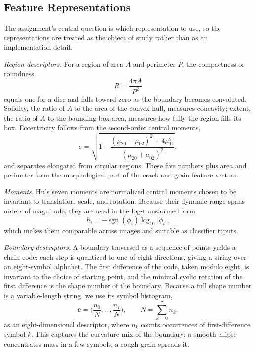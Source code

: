 \documentclass{ieeeaccess}
\begin{document}
\subsection{Feature Representations}
\label{sec:features}
The assignment's central question is which representation to use, so the
representations are treated as the object of study rather than as an
implementation detail.

\emph{Region descriptors.} For a region of area $A$ and perimeter $P$, the
compactness or roundness
\begin{equation}
R=\frac{4\pi A}{P^2}
\label{eq:roundness}
\end{equation}
equals one for a disc and falls toward zero as the boundary becomes convoluted.
Solidity, the ratio of $A$ to the area of the convex hull, measures concavity;
extent, the ratio of $A$ to the bounding-box area, measures how fully the region
fills its box. Eccentricity follows from the second-order central moments,
\begin{equation}
e=\sqrt{1-\frac{(\mu_{20}-\mu_{02})^2+4\mu_{11}^2}{(\mu_{20}+\mu_{02})^2}},
\label{eq:ecc}
\end{equation}
and separates elongated from circular regions. These five numbers plus area and
perimeter form the morphological part of the crack and grain feature vectors.

\emph{Moments.} Hu's seven moments are normalized central moments chosen to be
invariant to translation, scale, and rotation. Because their dynamic range spans
orders of magnitude, they are used in the log-transformed form
\begin{equation}
h_i=-\operatorname{sgn}(\phi_i)\log_{10}\lvert\phi_i\rvert,
\label{eq:hulog}
\end{equation}
which makes them comparable across images and suitable as classifier inputs.

\emph{Boundary descriptors.} A boundary traversed as a sequence of points yields
a chain code: each step is quantized to one of eight directions, giving a string
over an eight-symbol alphabet. The first difference of the code, taken modulo
eight, is invariant to the choice of starting point, and the minimal cyclic
rotation of the first difference is the shape number of the boundary. Because a
full shape number is a variable-length string, we use its symbol histogram,
\begin{equation}
\mathbf{c}=\Big(\frac{n_0}{N},\dots,\frac{n_7}{N}\Big),\qquad
N=\sum_{k=0}^{7}n_k,
\label{eq:chainhist}
\end{equation}
as an eight-dimensional descriptor, where $n_k$ counts occurrences of
first-difference symbol $k$. This captures the curvature mix of the boundary:
a smooth ellipse concentrates mass in a few symbols, a rough grain spreads it.
\end{document}
